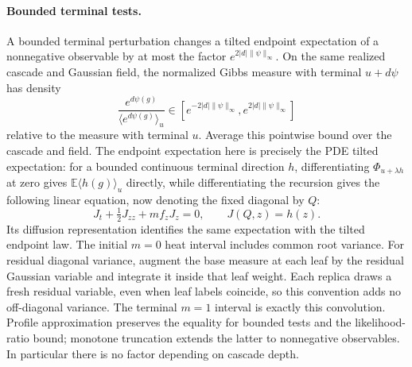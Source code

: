 \documentclass[11pt,a4paper]{article}
\numberwithin{equation}{section}
\theoremstyle{definition}
\theoremstyle{remark}
\newcommand{\E}{\mathbb E}
\begin{document}
\paragraph{Bounded terminal tests.}
A bounded terminal perturbation changes a tilted endpoint
expectation of a nonnegative observable by at most the factor
$e^{2|d|\|\psi\|_\infty}$.  On the same realized cascade and Gaussian
field, the normalized Gibbs measure with terminal $u+d\psi$ has density
\[
 \frac{e^{d\psi(g)}}{\langle e^{d\psi(g)}\rangle_u}
 \in[e^{-2|d|\|\psi\|_\infty},e^{2|d|\|\psi\|_\infty}]
\]
relative to the measure with terminal $u$.  Average this pointwise bound
over the cascade and field.  The endpoint expectation here is precisely
the PDE tilted expectation: for a bounded continuous terminal direction
$h$, differentiating $\Phi_{u+\lambda h}$ at zero gives
$\E\langle h(g)\rangle_u$ directly, while differentiating the recursion
gives the following linear equation, now denoting the fixed diagonal by
$Q$:
\[
 J_t+\tfrac12J_{zz}+m f_zJ_z=0,\qquad J(Q,z)=h(z).
\]
Its diffusion representation identifies the same expectation with the
tilted endpoint law.  The initial $m=0$ heat interval includes common
root variance.  For residual diagonal variance, augment the base measure
at each leaf by the residual Gaussian variable and integrate it inside
that leaf weight.  Each replica draws a fresh residual variable, even
when leaf labels coincide, so this convention adds no off-diagonal
variance.  The terminal $m=1$ interval is exactly this convolution.
Profile approximation preserves the equality for bounded tests and the
likelihood-ratio bound; monotone truncation extends the latter to
nonnegative observables.  In particular there is no factor depending on
cascade depth.
\end{document}
